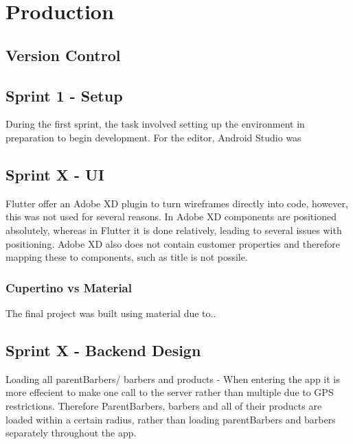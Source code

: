 \documentclass[12pt]{article}
\begin{document}
	\section{Production}
	\subsection{Version Control}
	
	\subsection{Sprint 1 - Setup}
	During the first sprint, the task involved setting up the environment in preparation to begin development. For the editor, Android Studio was 
	
	\subsection{Sprint X - UI}
	Flutter offer an Adobe XD plugin to turn wireframes directly into code, however, this was not used for several reasons. In Adobe XD components are positioned absolutely, whereas in Flutter it is done relatively, leading to several issues with positioning. Adobe XD also does not contain customer properties and therefore mapping these to components, such as title is not possile.
	
	\subsubsection{Cupertino vs Material}
	The final project was built using material due to..
	
	\subsection{Sprint X - Backend Design}
	
	Loading all parentBarbers/ barbers and products - 
	When entering the app it is more effecient to make one call to the server rather than multiple due to GPS restrictions. Therefore ParentBarbers, barbers and all of their products are loaded within a certain radius, rather than loading parentBarbers and barbers separately throughout the app. 
	
	

	
\end{document}
